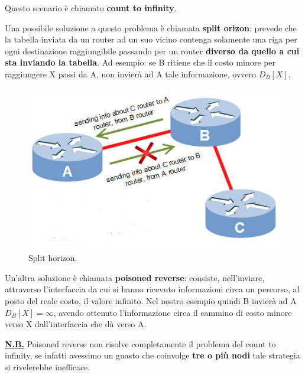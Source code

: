 \documentclass[11pt,a4paper,oneside]{book}
\theoremstyle{definition}
\begin{document}
Questo scenario è chiamato \textbf{count to infinity}.

Una possibile soluzione a questo problema è chiamata \textbf{split orizon}: prevede che la tabella inviata da un router ad un suo vicino contenga solamente una riga per ogni destinazione raggiungibile passando per un router \textbf{diverso da quello a cui sta inviando la tabella}. Ad esempio: se B ritiene che il costo minore per raggiungere X passi da A, non invierà ad A tale informazione, ovvero $D_{B}[X]$.

\begin{figure}[!h]
	\centering
	\includegraphics[scale=0.5]{Immagini/split-horizon.jpg}
	\caption{Split horizon.}
\end{figure}

\pagebreak

Un'altra soluzione è chiamata \textbf{poisoned reverse}: consiste, nell'inviare, attraverso l'interfaccia da cui si hanno ricevuto informazioni circa un percorso, al posto del reale costo, il valore infinito. Nel nostro esempio quindi B invierà ad A $D_{B}[X] = \infty$, avendo ottenuto l'informazione circa il cammino di costo minore verso X dall'interfaccia che dà verso A.

\textbf{\underline{N.B.}} Poisoned reverse non risolve completamente il problema del count to infinity, se infatti avessimo un guasto che coinvolge \textbf{tre o più nodi} tale strategia si rivelerebbe inefficace.
\end{document}
